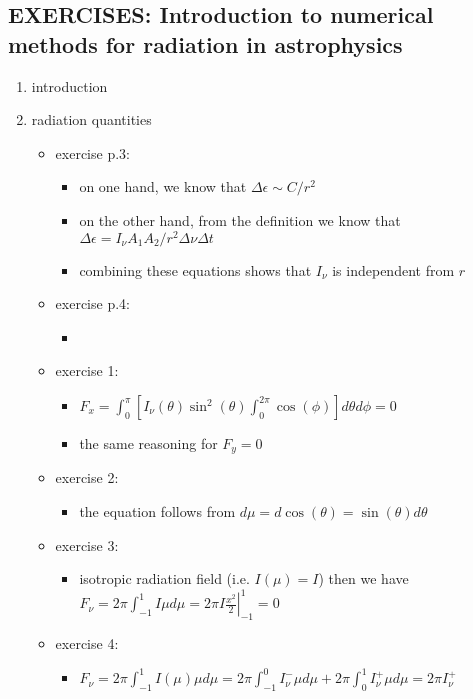 \documentclass[../main/main.tex]{subfiles}
\begin{document}
\subsection{EXERCISES: Introduction to numerical methods for radiation in astrophysics}
\begin{enumerate}
\item introduction
\item radiation quantities
\begin{itemize}

\item exercise p.3: 
\begin{itemize}
\item on one hand, we know that $\Delta \epsilon \sim C/r^2 $
\item on the other hand, from the definition we know  that $\Delta \epsilon = I_{\nu} A_1 A_2/r^2 \Delta \nu \Delta t$
\item combining these equations shows that $I_{\nu}$ is independent from $r$
\end{itemize}

\item exercise p.4:
\begin{itemize}
\item 
\end{itemize}

\item exercise 1:
\begin{itemize}
\item $F_x =  \int_0^{\pi} \left[ I_{\nu}(\theta)\sin^2(\theta) \int_0^{2 \pi}\cos(\phi) \right] d\theta d \phi = 0 $
\item the same reasoning for $F_y = 0$
\end{itemize}

\item exercise 2:
\begin{itemize}
\item the equation follows from $d\mu = d\cos(\theta) = \sin(\theta) d\theta$
\end{itemize}

\item exercise 3: 
\begin{itemize}
\item isotropic radiation field (i.e. $I(\mu) = I$) then we have $F_{\nu} = 2 \pi  \int_{-1}^{1} I \mu d\mu = 2 \pi I \left. \frac{x^2}{2}\right \rvert_
{-1}^{1} = 0$
\end{itemize}

\item exercise 4:
\begin{itemize}
\item $F_{\nu} = 2 \pi  \int_{-1}^{1} I(\mu) \mu d\mu 
	= 2 \pi  \int_{-1}^{0} I_{\nu}^{-} \mu d\mu 
	+ 2 \pi  \int_{0}^{1} I_{\nu}^{+} \mu d\mu 
	= 2 \pi I_{\nu}^+ $
\end{itemize}


\end{itemize}
\end{enumerate}
\end{document}

